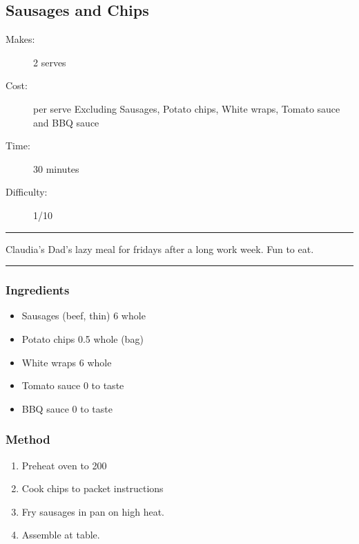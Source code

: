 \documentclass[]{article}
\begin{document}
\subsection*{\center\huge Sausages and Chips}
\begin{description}
\item[Makes:] 2 serves
\item[Cost:]  per serve Excluding Sausages, Potato chips, White wraps, Tomato sauce and BBQ sauce
\item[Time:] 30 minutes
\item[Difficulty:] 1/10
\end{description}
\vspace{0.2cm}\hrule\vspace{0.5cm}
\begin{adjustwidth}{0.5 cm}{0.5 cm}

Claudia's Dad's lazy meal for fridays after a long work week. Fun to eat. \hfill{}\color{black}

\end{adjustwidth}
\vspace{0.5cm}\hrule
\subsubsection*{\Large Ingredients}
\begin{multicols}{2}
\begin{itemize}
 \item Sausages (beef, thin) \hfill 6 whole
 \item Potato chips \hfill 0.5 whole (bag)
 \item White wraps \hfill 6 whole
 \item Tomato sauce \hfill 0 to taste
 \item BBQ sauce \hfill 0 to taste
\end{itemize}
\end{multicols}
\subsubsection*{\Large Method}
\begin{enumerate}[font=\huge\color{accent}]
	\item Preheat oven to 200
	\item Cook chips to packet instructions
	\item Fry sausages in pan on high heat.
	\item Assemble at table.
\end{enumerate}
\newpage
{}
\end{document}
